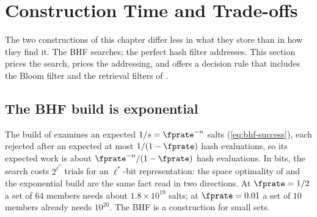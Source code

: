 %

\section{Construction Time and Trade-offs}
\label{sec:construction-time}

The two constructions of this chapter differ less in what they store than
in how they find it. The BHF searches; the perfect hash filter
addresses. This section prices the search, prices the addressing, and
offers a decision rule that includes the Bloom filter and the retrieval
filters of .

\subsection*{The BHF build is exponential}

The build of  examines an expected $1/s =
\fprate^{-n}$ salts (\eqref{eq:bhf-success}), each rejected after an
expected at most $1/(1 - \fprate)$ hash evaluations, so its expected work
is about $\fprate^{-n}/(1 - \fprate)$ hash evaluations. In bits, the
search costs $2^{\ell^{*}}$ trials for an $\ell^{*}$-bit representation:
the space optimality of  and the exponential
build are the same fact read in two directions. At $\fprate = 1/2$ a set
of $64$ members needs about $1.8 \times 10^{19}$ salts; at $\fprate =
0.01$ a set of $10$ members already needs $10^{20}$. The BHF is a
construction for small sets.

